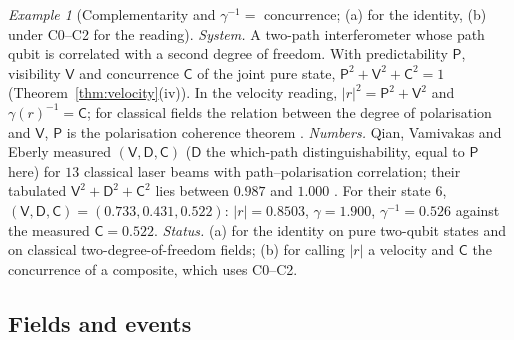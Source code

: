 \documentclass[aps,pra,onecolumn,superscriptaddress,nofootinbib,10pt]{revtex4-2}
\theoremstyle{definition}
\theoremstyle{remark}
\newtheorem{example}[theorem]{Example}
\begin{document}
\begin{example}[Complementarity and $\gamma^{-1}=$ concurrence; (a) for the identity, (b) under C0--C2 for the reading]\label{ex:pvc}
\emph{System.}  A two-path interferometer whose path qubit is correlated with a second degree of freedom.
With predictability $\mathsf P$, visibility $\mathsf V$ \cite{ex-GY88,ex-Englert96} and concurrence $\mathsf C$
\cite{Wootters} of the joint pure state, $\mathsf P^2+\mathsf V^2+\mathsf C^2=1$ \cite{JB} (Theorem~\ref{thm:velocity}(iv)).  In
the velocity reading, $\lvert r\rvert^2=\mathsf P^2+\mathsf V^2$ and $\gamma(r)^{-1}=\mathsf C$; for classical fields the relation
between the degree of polarisation and $\mathsf V$, $\mathsf P$ is the polarisation coherence theorem \cite{ex-EQV17}.
\emph{Numbers.}  Qian, Vamivakas and Eberly measured $(\mathsf V,\mathsf D,\mathsf C)$ ($\mathsf D$ the which-path
distinguishability, equal to $\mathsf P$ here) for $13$ classical laser beams with path--polarisation
correlation; their tabulated $\mathsf V^2+\mathsf D^2+\mathsf C^2$ lies between $0.987$ and $1.000$ \cite{ex-QVE18}.  For
their state 6, $(\mathsf V,\mathsf D,\mathsf C)=(0.733,0.431,0.522)$: $\lvert r\rvert=0.8503$, $\gamma=1.900$, $\gamma^{-1}=0.526$ against the
measured $\mathsf C=0.522$.
\emph{Status.}  (a) for the identity on pure two-qubit states and on classical two-degree-of-freedom
fields; (b) for calling $\lvert r\rvert$ a velocity and $\mathsf C$ the concurrence of a composite, which uses
C0--C2.
\end{example}

\subsection{Fields and events}
\end{document}
